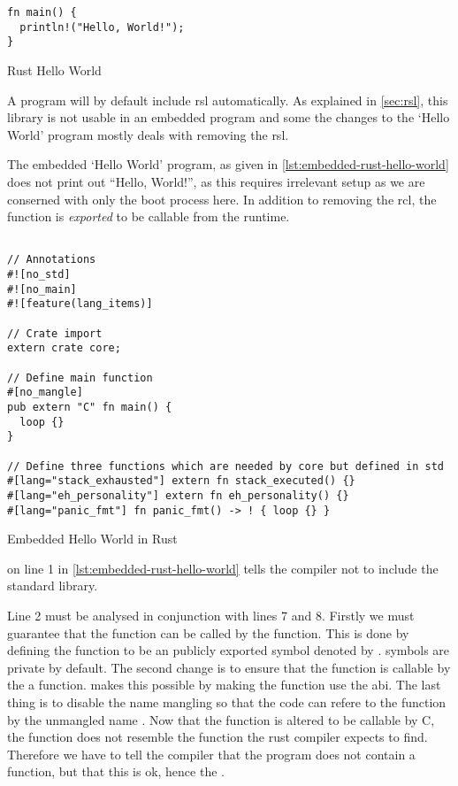 \begin{listing}[H]
  \begin{verbatim}
fn main() {
  println!("Hello, World!");
}
  \end{verbatim}
  \caption{Rust Hello World}
  \label{lst:rust-hello-world}
\end{listing}

A {\rust} program will by default include \gls{rsl} automatically.
As explained in \autoref{sec:rsl}, this library is not usable in an embedded program and some the changes to the `Hello World' program mostly deals with removing the \gls{rsl}.

The embedded `Hello World' program, as given in \autoref{lst:embedded-rust-hello-world} does not print out ``Hello, World!'', as this requires irrelevant setup as we are conserned with only the boot process here.
In addition to removing the \gls{rcl}, the {\main} function is \emph{exported} to be callable from the {\C} runtime.

\begin{listing}[H]
  \begin{verbatim}

// Annotations
#![no_std]
#![no_main]
#![feature(lang_items)]

// Crate import
extern crate core;

// Define main function
#[no_mangle]
pub extern "C" fn main() {
  loop {}
}

// Define three functions which are needed by core but defined in std
#[lang="stack_exhausted"] extern fn stack_executed() {}
#[lang="eh_personality"] extern fn eh_personality() {}
#[lang="panic_fmt"] fn panic_fmt() -> ! { loop {} }
\end{verbatim}
\caption{Embedded Hello World in Rust}
\label{lst:embedded-rust-hello-world}
\end{listing}

\attrib{\#\![no\_std]} on line 1 in \autoref{lst:embedded-rust-hello-world} tells the {\rust} compiler not to include the standard library.

Line 2 must be analysed in conjunction with lines 7 and 8.
Firstly we must guarantee that the function can be called by the  function.
This is done by defining the {\main} function to be an publicly exported symbol denoted by .
{\rust} symbols are private by default.
The second change is to ensure that the function is callable by the a {\C} function.
 makes this possible by making the function use the {\C} \gls{abi}.
The last thing is to disable the {\rust} name mangling so that the {\C} code can refere to the function by the unmangled name {\main}.
Now that the {\main} function is altered to be callable by C, the function does not resemble the function the rust compiler expects to find.
Therefore we have to tell the compiler that the program does not contain a {\main} function, but that this is ok, hence the \attrib{\#\![no\_main]}.

